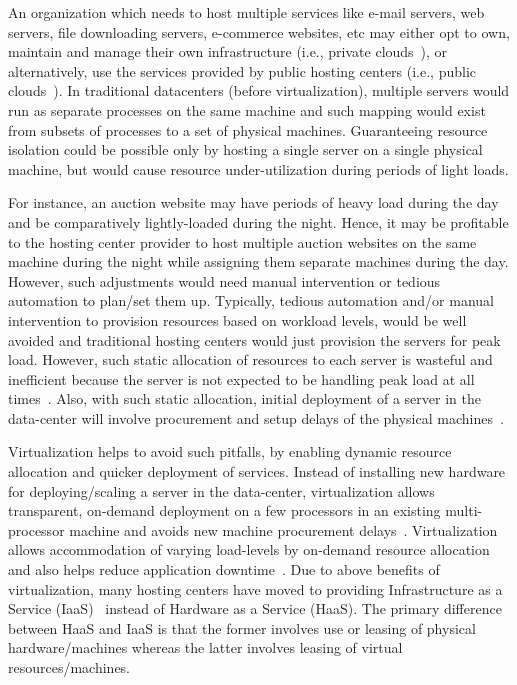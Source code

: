An organization which needs to host multiple services like e-mail servers,
web servers, file downloading servers, e-commerce websites, etc may either opt
to own, maintain and manage their own 
infrastructure (i.e., private 
clouds~\cite{ubuntu-private-cloud}), 
or alternatively, use the services provided by public hosting 
centers (i.e., public clouds~\cite{ec2}). 
In traditional datacenters (before virtualization), multiple
servers would run as separate processes on the same machine and such
mapping would exist from subsets of processes to a set of physical machines.
Guaranteeing resource isolation could be possible only by hosting a single
server on a single physical machine, but would 
cause resource under-utilization
during periods of light loads.

For instance, an auction website may have
periods of heavy load during the day and be comparatively lightly-loaded
during the night. Hence, it may be profitable to the hosting center provider to
host multiple auction websites on the same machine during the night while
assigning them separate machines during the day. However, such adjustments
would need manual intervention or tedious automation to plan/set them up.
Typically, tedious automation and/or manual intervention to provision 
resources based on workload levels, would be well avoided and traditional
hosting centers would just provision the servers for peak load.
However, such static allocation of resources to each server is wasteful
and inefficient because
the server is not expected to be handling peak load at all 
times~\cite{capacity-planning, emerging-research-directions}. Also, with
such static allocation, initial deployment of a server in the data-center
will involve procurement and setup delays of the physical 
machines~\cite{xen-art-of-virtualization}. 

Virtualization helps to avoid
such pitfalls, by enabling dynamic resource allocation and 
quicker deployment
of services. Instead of installing new hardware for deploying/scaling a server
in the data-center, virtualization 
allows transparent, on-demand deployment on a few
processors in an existing multi-processor machine and avoids new machine
procurement delays~\cite{xen-art-of-virtualization}. 
Virtualization allows accommodation of varying load-levels by
on-demand resource allocation~\cite{xen-art-of-virtualization-revisited}
and also helps reduce application downtime~\cite{google-live-migration}. 
Due to above benefits of virtualization, 
many hosting centers have moved to providing 
Infrastructure as a Service (IaaS)~\cite{ec2, azure} instead of
Hardware as a Service (HaaS).
The primary difference between HaaS and IaaS is that the 
former involves use or leasing of physical
hardware/machines whereas the latter involves 
leasing of virtual resources/machines.


